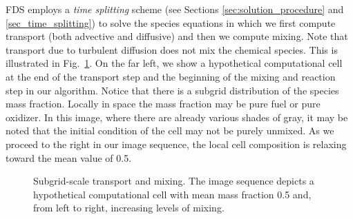 FDS employs a \emph{time splitting} scheme (see Sections \ref{sec:solution_procedure} and \ref{sec_time_splitting}) to solve the species equations in which we first compute transport (both advective and diffusive) and then we compute mixing.  Note that transport due to turbulent diffusion does not mix the chemical species.  This is illustrated in Fig.~\ref{fig_transport_vs_mixing}.  On the far left, we show a hypothetical computational cell at the end of the transport step and the beginning of the mixing and reaction step in our algorithm.  Notice that there is a subgrid distribution of the species mass fraction.  Locally in space the mass fraction may be pure fuel or pure oxidizer.  In this image, where there are already various shades of gray, it may be noted that  the initial condition of the cell may not be purely unmixed.  As we proceed to the right in our image sequence, the local cell composition is relaxing toward the mean value of 0.5.

\begin{figure}
\begin{center}
\end{center}
\caption{Subgrid-scale transport and mixing. The image sequence depicts a hypothetical computational cell with mean mass fraction 0.5 and, from left to right, increasing levels of mixing.}
\label{fig_transport_vs_mixing}
\end{figure}

